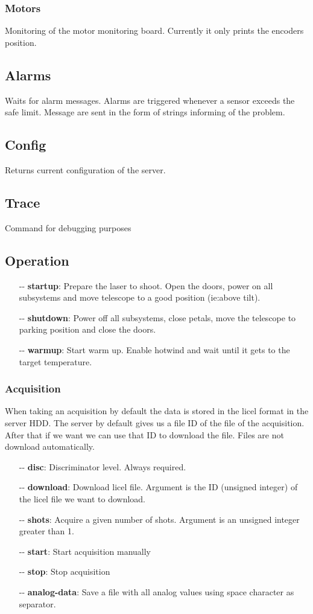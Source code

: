 \documentclass[letterpaper, 10 pt]{article}
\begin{document}
\subsubsection{Motors}
Monitoring of the motor monitoring board. Currently it only prints the encoders position.

\subsection{Alarms}
Waits for alarm messages. Alarms are triggered whenever a sensor exceeds the safe limit. Message are sent in the form of strings informing of the problem.

\subsection{Config}
Returns current configuration of the server.

\subsection{Trace}
Command for debugging purposes

\subsection{Operation} \label{operationcmds}
\begin{itemize}
	\item[-{}-] \textbf{startup}: Prepare the laser to shoot. Open the doors, power on all subsystems and move telescope to a good position (ie:above tilt).
	\item[-{}-] \textbf{shutdown}: Power off all subsystems, close petals, move the telescope to parking position and close the doors.
	\item[-{}-] \textbf{warmup}: Start warm up. Enable hotwind and wait until it gets to the target temperature.
\end{itemize}
\subsubsection{Acquisition}
When taking an acquisition by default the data is stored in the licel format in the server HDD. The server by default gives us a file ID of the file of the acquisition. After that if we want we can use that ID to download the file. Files are not download automatically.
\begin{itemize}
	\item[-{}-] \textbf{disc}: Discriminator level. Always required.
	\item[-{}-] \textbf{download}: Download licel file. Argument is the ID (unsigned integer) of the licel file we want to download.
	\item[-{}-] \textbf{shots}: Acquire a given number of shots. Argument is an unsigned integer greater than 1. 
	\item[-{}-] \textbf{start}: Start acquisition manually
	\item[-{}-] \textbf{stop}: Stop acquisition
	\item[-{}-] \textbf{analog-data}: Save a file with all analog values using space character as separator.
\end{itemize}
\end{document}
